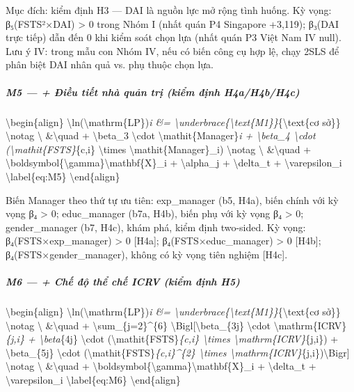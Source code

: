 \documentclass[12pt,a4paper]{article}
\begin{document}
Mục đích: kiểm định H3 --- DAI là nguồn lực mở rộng tình huống. Kỳ vọng:
β₅(FSTS²×DAI) \textgreater{} 0 trong Nhóm I (nhất quán P4 Singapore
+3,119); β₃(DAI trực tiếp) dẫn đến 0 khi kiểm soát chọn lựa (nhất quán
P3 Việt Nam IV null). Lưu ý IV: trong mẫu con Nhóm IV, nếu có biến công
cụ hợp lệ, chạy 2SLS để phân biệt DAI nhân quả vs. phụ thuộc chọn lựa.

\hypertarget{m5---ux111iux1ec1u-tiux1ebft-nhuxe0-quux1ea3n-trux1ecb-kiux1ec3m-ux111ux1ecbnh-h4ah4bh4c}{%
\subparagraph{M5 --- + Điều tiết nhà quản trị (kiểm định
H4a/H4b/H4c)}\label{m5---ux111iux1ec1u-tiux1ebft-nhuxe0-quux1ea3n-trux1ecb-kiux1ec3m-ux111ux1ecbnh-h4ah4bh4c}}

\textbackslash begin\{align\}
\textbackslash ln(\textbackslash mathrm\{LP\})\emph{i \&=
\textbackslash underbrace\{\textbackslash text\{M1\}\}}\{\textbackslash text\{cơ
sở\}\} \textbackslash notag \textbackslash{} \&\textbackslash quad +
\textbackslash beta\_3 \textbackslash cdot
\textbackslash mathit\{Manager\}\emph{i + \textbackslash beta\_4
\textbackslash cdot (\textbackslash mathit\{FSTS\}}\{c,i\}
\textbackslash times \textbackslash mathit\{Manager\}\_i)
\textbackslash notag \textbackslash{} \&\textbackslash quad +
\textbackslash boldsymbol\{\textbackslash gamma\}\textquotesingle\textbackslash mathbf\{X\}\_i
+ \textbackslash alpha\_j + \textbackslash delta\_t +
\textbackslash varepsilon\_i \textbackslash label\{eq:M5\}
\textbackslash end\{align\}

Biến Manager theo thứ tự ưu tiên: exp\_manager (b5, H4a), biến chính với
kỳ vọng β₄ \textgreater{} 0; educ\_manager (b7a, H4b), biến phụ với kỳ
vọng β₄ \textgreater{} 0; gender\_manager (b7, H4c), khám phá, kiểm định
two-sided. Kỳ vọng: β₄(FSTS×exp\_manager) \textgreater{} 0 {[}H4a{]};
β₄(FSTS×educ\_manager) \textgreater{} 0 {[}H4b{]};
β₄(FSTS×gender\_manager), không có kỳ vọng tiên nghiệm {[}H4c{]}.

\hypertarget{m6---chux1ebf-ux111ux1ed9-thux1ec3-chux1ebf-icrv-kiux1ec3m-ux111ux1ecbnh-h5}{%
\subparagraph{M6 --- + Chế độ thể chế ICRV (kiểm định
H5)}\label{m6---chux1ebf-ux111ux1ed9-thux1ec3-chux1ebf-icrv-kiux1ec3m-ux111ux1ecbnh-h5}}

\textbackslash begin\{align\}
\textbackslash ln(\textbackslash mathrm\{LP\})\emph{i \&=
\textbackslash underbrace\{\textbackslash text\{M1\}\}}\{\textbackslash text\{cơ
sở\}\} \textbackslash notag \textbackslash{} \&\textbackslash quad +
\textbackslash sum\_\{j=2\}\^{}\{6\}
\textbackslash Bigl{[}\textbackslash beta\_\{3j\} \textbackslash cdot
\textbackslash mathrm\{ICRV\}\emph{\{j,i\} + \textbackslash beta}\{4j\}
\textbackslash cdot (\textbackslash mathit\{FSTS\}\emph{\{c,i\}
\textbackslash times \textbackslash mathrm\{ICRV\}}\{j,i\}) +
\textbackslash beta\_\{5j\} \textbackslash cdot
(\textbackslash mathit\{FSTS\}\emph{\{c,i\}\^{}\{2\}
\textbackslash times
\textbackslash mathrm\{ICRV\}}\{j,i\})\textbackslash Bigr{]}
\textbackslash notag \textbackslash{} \&\textbackslash quad +
\textbackslash boldsymbol\{\textbackslash gamma\}\textquotesingle\textbackslash mathbf\{X\}\_i
+ \textbackslash delta\_t + \textbackslash varepsilon\_i
\textbackslash label\{eq:M6\} \textbackslash end\{align\}
\end{document}
